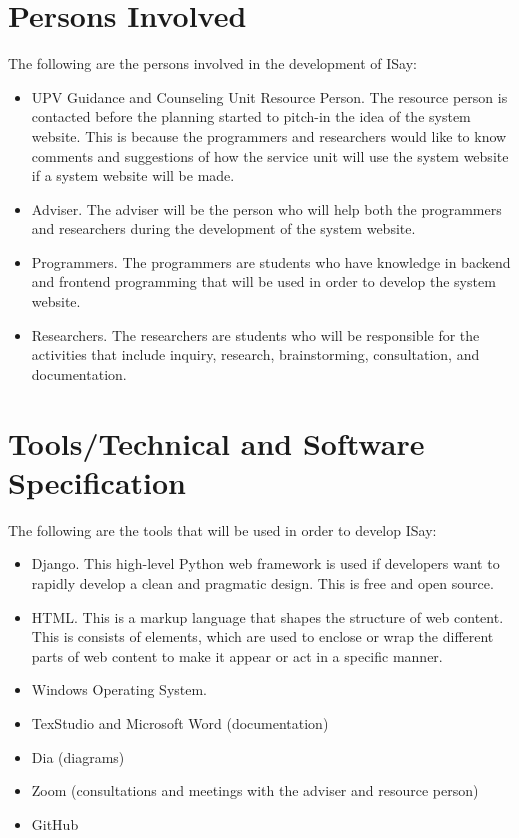 \section{Persons Involved}
 The following are the persons involved in the development of ISay: 
	\begin{itemize}
	\item UPV Guidance and Counseling Unit Resource Person. The resource person is contacted before the planning started to pitch-in the idea of the system website. This is because the programmers and researchers would like to know comments and suggestions of how the service unit will use the system website if a system website will be made. 
	\item  Adviser. The adviser will be the person who will help both the programmers and researchers during the development of the system website. 
	\item Programmers. The programmers are students who have knowledge in backend and frontend programming that will be used in order to develop the system website. 
	\item  Researchers. The researchers are students who will be responsible for the activities that include inquiry, research, brainstorming, consultation, and documentation. 
	\end{itemize}


\section{Tools/Technical and Software Specification}
The following are the tools that will be used in order to develop ISay: 
	\begin{itemize}
	\item Django. This high-level Python web framework is used if developers want to rapidly develop a clean and pragmatic design. This is free and open source.
	\item  HTML. This is a markup language that shapes the structure of web content. This is consists of elements, which are used to enclose or wrap the different parts of web content to make it appear or act in a specific manner. 
	\item Windows Operating System.  
	\item  TexStudio and Microsoft Word (documentation) 
	\item Dia (diagrams) 
	\item Zoom (consultations and meetings with the adviser and resource person) 
	\item GitHub 
	\end{itemize}


